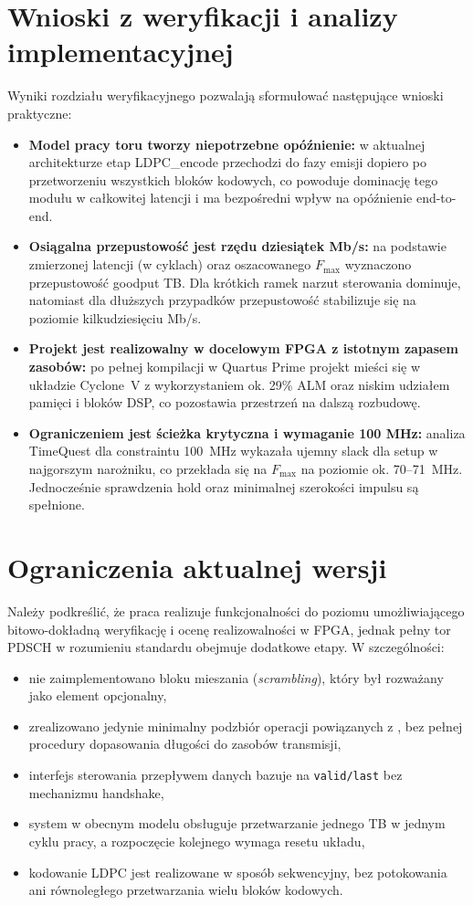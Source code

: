 \section*{Wnioski z weryfikacji i analizy implementacyjnej}
Wyniki rozdziału weryfikacyjnego pozwalają sformułować następujące wnioski praktyczne:

\begin{itemize}
  \item \textbf{Model pracy toru tworzy niepotrzebne opóźnienie:} w aktualnej architekturze etap LDPC\_encode przechodzi do fazy emisji dopiero po przetworzeniu wszystkich bloków kodowych, co powoduje dominację tego modułu w całkowitej latencji i ma bezpośredni wpływ na opóźnienie end-to-end. 

  \item \textbf{Osiągalna przepustowość jest rzędu dziesiątek Mb/s:} na podstawie zmierzonej latencji (w cyklach) oraz oszacowanego $F_{\max}$ wyznaczono przepustowość goodput TB. Dla krótkich ramek narzut sterowania dominuje, natomiast dla dłuższych przypadków przepustowość stabilizuje się na poziomie kilkudziesięciu Mb/s. 
  \item \textbf{Projekt jest realizowalny w docelowym FPGA z istotnym zapasem zasobów:}
  po pełnej kompilacji w Quartus Prime projekt mieści się w układzie Cyclone~V z wykorzystaniem ok. 29\% ALM oraz niskim udziałem pamięci i bloków DSP, co pozostawia przestrzeń na dalszą rozbudowę. 

  \item \textbf{Ograniczeniem jest ścieżka krytyczna i wymaganie 100 MHz:}
  analiza TimeQuest dla constraintu 100~MHz wykazała ujemny slack dla setup w najgorszym narożniku, co przekłada się na $F_{\max}$ na poziomie ok. 70--71~MHz.
  Jednocześnie sprawdzenia hold oraz minimalnej szerokości impulsu są spełnione. 
\end{itemize}

\section*{Ograniczenia aktualnej wersji}
Należy podkreślić, że praca realizuje funkcjonalności do poziomu umożliwiającego bitowo-dokładną weryfikację i ocenę realizowalności w FPGA, jednak pełny tor PDSCH w rozumieniu standardu obejmuje dodatkowe etapy. W szczególności:
\begin{itemize}
  \item nie zaimplementowano bloku mieszania (\textit{scrambling}), który był rozważany jako element opcjonalny,
  \item zrealizowano jedynie minimalny podzbiór operacji powiązanych z , bez pełnej procedury dopasowania długości do zasobów transmisji,
  \item interfejs sterowania przepływem danych bazuje na \texttt{valid/last} bez mechanizmu handshake,
  \item system w obecnym modelu obsługuje przetwarzanie jednego TB w jednym cyklu pracy, a rozpoczęcie kolejnego wymaga resetu układu,
  \item kodowanie LDPC jest realizowane w sposób sekwencyjny, bez potokowania ani równoległego przetwarzania wielu bloków kodowych. 
\end{itemize}

